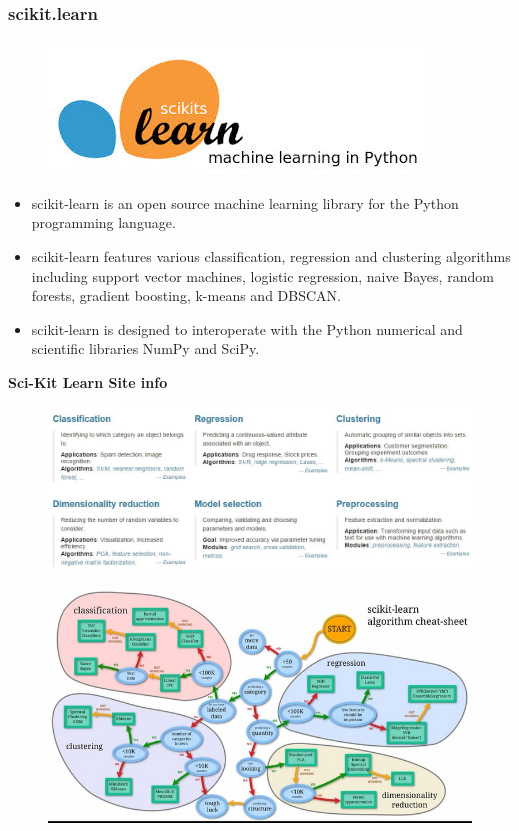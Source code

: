\documentclass{beamer}
\begin{document}
\begin{frame}
	\frametitle{scikit.learn}
	\begin{figure}
		\centering
		\includegraphics[width=0.5\linewidth]{SKL-logo2}
		
	\end{figure}
	
	\begin{itemize}
		\item scikit-learn is an open source machine learning library for the Python programming language. 
		\item scikit-learn features various classification, regression and clustering algorithms including support vector machines, logistic regression, naive Bayes, random forests, gradient boosting, k-means and DBSCAN. \item scikit-learn is designed to interoperate with the Python numerical and scientific libraries NumPy and SciPy.
	\end{itemize}
\end{frame}
\begin{frame}
	\textbf{Sci-Kit Learn Site info}
	\begin{figure}
		\centering
		\includegraphics[width=1.1\linewidth]{SKLsiteinfo}
	\end{figure}
\end{frame}
\begin{frame}
	\begin{figure}
		\centering
		\includegraphics[width=0.9\linewidth]{SKLCheatSheet}
		
	\end{figure}
\end{frame}
\end{document}
